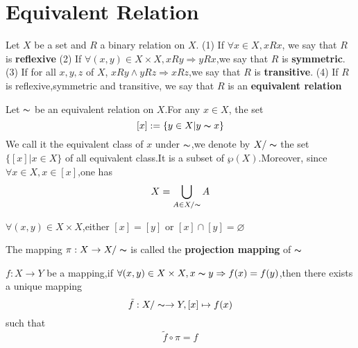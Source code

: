 \documentclass{book}
\numberwithin{equation}{section}
\begin{document}
\section{Equivalent Relation}
\begin{definitionenv}
    Let $X$ be a set and $R$ a binary relation on $X$.
    \newline
    (1) If $\forall x \in X ,xRx$, we say that $R$ is \textbf{reflexive}
    \newline
    (2) If $\forall (x,y) \in X\times X,xRy\Rightarrow yRx$,we say that $R$ is \textbf{symmetric}.
    \newline
    (3) If for all $x,y,z$ of $X$, $xRy\wedge yRz\Rightarrow xRz$,we say that $R$ is \textbf{transitive}.
    \newline
    (4) If $R$ is reflexive,symmetric and transitive, we say that $R$ is an \textbf{equivalent relation}

\end{definitionenv}
\begin{definitionenv}
    Let $\thicksim$ be an equivalent relation on $X$.For any $x\in X$, the set $$[x]:=\{y\in X|y\thicksim x\}$$ We call it the equivalent class of $x$ under $\thicksim$,we denote by $X/\thicksim$ the set $\{[x]|x\in X\}$ of all equivalent class.It is a subset of $\wp (X)$.Moreover, since $\forall x\in X,x\in [x] $,one has $$X=\bigcup_{A\in X/\thicksim}A $$
\end{definitionenv}
\begin{propositionenv}
    $\forall (x,y)\in X\times X$,either $[x]=[y]$ or $[x]\cap [y]=\varnothing$
\end{propositionenv}
\begin{definitionenv}
    The mapping $\pi :X\rightarrow X/\thicksim$ is called the \textbf{projection mapping} of $\thicksim$
\end{definitionenv}
\begin{propositionenv}
    $f:X\rightarrow Y$ be a mapping,if $\forall (x,y)\in X\times X,x\thicksim y\Rightarrow f(x)=f(y)$,then there exists a unique mapping$$\tilde{f}:X/\thicksim\rightarrow Y, [x]\mapsto f(x)$$such that $$\tilde{f}\circ \pi =f$$


\begin{center}
\end{center}
\end{propositionenv}
\end{document}
